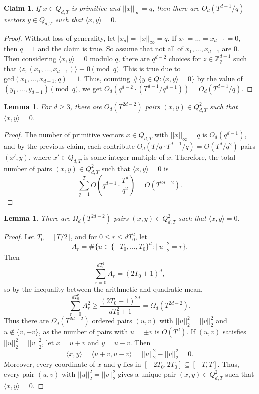 \documentclass[11pt]{article}
\theoremstyle{plain}
\newtheorem{claim}[theorem]{Claim}
\newtheorem{lemma}[theorem]{Lemma}
\theoremstyle{definition}
\begin{document}
	\begin{claim}\label{claim:primitive}
		If $x\in Q_{d,T}$ is primitive and $||x||_{\infty}=q$, then there are $O_d(T^{d-1}/q)$ vectors $y\in Q_{d,T}$ such that $\langle x,y\rangle=0$.
	\end{claim}
	\begin{proof}
		Without loss of generality, let $|x_d|=||x||_{\infty}=q$. If $x_1=\dots=x_{d-1}=0$, then $q=1$ and the claim is true. So assume that not all of $x_1,\dots,x_{d-1}$ are 0. Then considering $\langle x,y\rangle=0$ modulo $q$, there are $q^{d-2}$ choices for $z\in \mathbb{Z}_q^{d-1}$ such that $\langle z,(x_1,\dots,x_{d-1})\rangle\equiv 0 \pmod{q}$. This is true due to $\text{gcd}(x_1,\dots,x_{d-1},q)=1$. Thus, counting $\#\{y\in Q:\langle x,y\rangle=0\}$ by the value of $(y_1,\dots,y_{d-1})\pmod{q}$, we get $O_d(q^{d-2}\cdot (T^{d-1}/q^{d-1}))=O_d(T^{d-1}/q)$.
	\end{proof}
	
	\begin{lemma}\label{lemma:num_pairs_upper}
		For $d\geq 3$, there are $O_d(T^{2d-2})$ pairs $(x,y)\in Q^2_{d,T}$ such that $\langle x,y\rangle=0$.
	\end{lemma}
	
	\begin{proof}
		The number of primitive vectors $x\in Q_{d,T}$ with $||x||_{\infty}=q$ is $O_d(q^{d-1})$, and by the previous claim, each contribute $O_d(T/q\cdot T^{d-1}/q)=O(T^d/q^2)$ pairs $(x',y)$, where $x'\in Q_{d,T}$ is some integer multiple of $x$. Therefore, the total number of pairs $(x,y)\in Q^2_{d,T}$ such that $\langle x,y\rangle=0$ is
		$$\sum_{q=1}^T O\left( q^{d-1}\cdot \frac{T^{d}}{q^2}\right)=O(T^{2d-2}).$$
	\end{proof}
	
	\begin{lemma}\label{lemma:num_pairs_lower}
		There are $\Omega_d(T^{2d-2})$ pairs $(x,y)\in Q^2_{d,T}$ such that $\langle x,y\rangle=0$.
	\end{lemma}
	
	\begin{proof}
		Let $T_0=\lfloor T/2\rfloor$, and for $0\leq r\leq dT_0^2$, let
		$$A_r=\#\{u\in \{-T_0,\dots,T_0\}^d:||u||_2^2=r\}.$$
		Then $$\sum_{r=0}^{dT_0^2} A_r=(2T_0+1)^{d},$$ so by the inequality between the arithmetic and quadratic mean,
		$$\sum_{r=0}^{dT_0^2} A_r^2
		\ge \frac{(2T_0+1)^{2d}}{dT_0^2+1}
		=\Omega_d(T^{2d-2}).$$
		Thus there are $\Omega_d(T^{2d-2})$ ordered pairs $(u,v)$ with $||u||_2^2=||v||_2^2$ and $u\not\in\{v,-v\}$, as the number of pairs with $u=\pm v$ is $O(T^d)$. If  $(u,v)$ satisfies $||u||_2^2=||v||_2^2$, let
		$x=u+v$ and $y=u-v$.
		Then $$\langle x,y\rangle=\langle u+v,u-v\rangle
		=||u||_2^2-||v||_2^2=0.$$
		Moreover, every coordinate of $x$ and $y$ lies in $[-2T_0,2T_0]\subseteq[-T,T]$. Thus, every pair $(u,v)$ with $||u||_2^2=||v||_2^2$ gives a unique pair $(x,y)\in Q^2_{d,T}$ such that $\langle x,y\rangle=0$.
	\end{proof}
	
\end{document}
